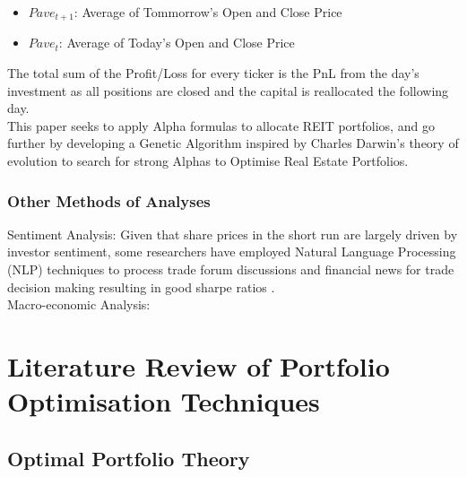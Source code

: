 \documentclass[a4paper,12pt]{report}
\numberwithin{equation}{section}
\theoremstyle{definition}
\begin{document}
\begin{itemize}
  \item {$Pave_{t+1}$: Average of Tommorrow's Open and Close Price}
  \item {$Pave_{t}$: Average of Today's Open and Close Price}
\end{itemize}

The total sum of the Profit/Loss for every ticker is the PnL from the day's investment as all positions are closed and the capital is reallocated the following day. \\

This paper seeks to apply Alpha formulas to allocate REIT portfolios, and go further by developing a Genetic Algorithm inspired by Charles Darwin's theory of evolution to search for strong Alphas to Optimise Real Estate Portfolios. 

\subsection{Other Methods of Analyses}
Sentiment Analysis: Given that share prices in the short run are largely driven by investor sentiment, some researchers have employed Natural Language Processing (NLP) techniques to process trade forum discussions and financial news for trade decision making resulting in good sharpe ratios \cite{alexandria_unlocking_2023}. \\

Macro-economic Analysis: 


\chapter{Literature Review of Portfolio Optimisation Techniques}
\section{Optimal Portfolio Theory}

\def\fillandplacepagenumber{%
 \par\pagestyle{empty}%
 \vbox to 0pt{\vss}\vfill
 \vbox to 0pt{\baselineskip0pt
   \hbox to\linewidth{\hss}%
   \baselineskip\footskip
   \hbox to\linewidth{%
     \hfil\thepage\hfil}\vss}}
\end{document}
